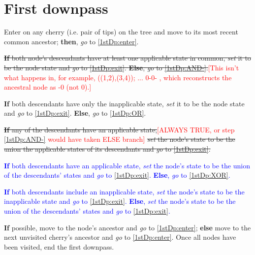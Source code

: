 \documentclass[a4paper,12pt]{article}
\begin{document}

\section{First downpass} \label{1stDp}



\begin{enumerate}
    \item Enter on any cherry (i.e. pair of tips) on the tree and move to its most recent common ancestor; \textbf{then}, \textit{go} to \ref{1stDp:enter}.
    \item \label{1stDp:enter} \sout{\textbf{If} both node's descendants have at least one applicable state in common, \textit{set} it to be the node state and \textit{go} to \ref{1stDp:exit}. \textbf{Else}, \textit{go} to \ref{1stDp:AND-}.}\textcolor{red}{[This isn't what happens in, for example, ((1,2),(3,4)); ... 0-0- , which reconstructs the ancestral node as -0 (not 0).]}
    \item \label{1stDp:AND-} \textbf{If} both descendants have only the inapplicable state, \textit{set} it to be the node state and \textit{go} to \ref{1stDp:exit}. \textbf{Else}, \textit{go} to \ref{1stDp:OR}.
    \item \label{1stDp:OR} \sout{\textbf{If} any of the descendants have an applicable state,}\textcolor{red}{[ALWAYS TRUE, or step \ref{1stDp:AND-} would have taken ELSE branch]}\sout{ \textit{set} the node's state to be the union the applicable states of its descendants and \textit{go} to \ref{1stDp:exit}.}\\
    \textcolor{blue}{\textbf{If} both descendants have an applicable state, \textit{set} the node's state to be the union of the descendants' states and \textit{go} to \ref{1stDp:exit}. \textbf{Else}, \textit{go} to \ref{1stDp:XOR}.
    \item \label{1stDp:XOR} \textbf{If} both descendants include an inapplicable state, \textit{set} the node's state to be the inapplicable state and \textit{go} to \ref{1stDp:exit}. \textbf{Else}, \textit{set} the node's state to be the union of the descendants' states and \textit{go} to \ref{1stDp:exit}.
    }
    \item \label{1stDp:exit} \textbf{If} possible, move to the node's ancestor and \textit{go} to \ref{1stDp:enter}; \textbf{else} move to the next unvisited cherry's ancestor and \textit{go} to \ref{1stDp:enter}. Once all nodes have been visited, end the first downpass.
\end{enumerate}
\end{document}
